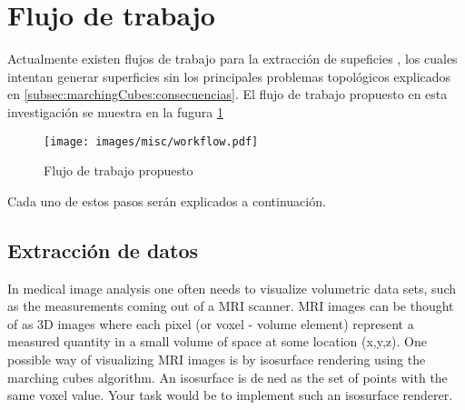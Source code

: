 \section{Flujo de trabajo}
\label{ch:propuesta:sec:flujoDeTrabajo}

Actualmente existen flujos de trabajo para la extracción de supeficies \cite{Ruprecht94ascheme}\cite{Dietrich_marchingcubes}, los cuales intentan generar superficies sin los principales problemas topológicos explicados en \ref{subsec:marchingCubes:consecuencias}. El flujo de trabajo propuesto en esta investigación se muestra en la fugura \ref{f:estadoDelArte:flujoDeTrabajo}

\begin{figure}[htb]
\centering
	\texttt{[image: images/misc/workflow.pdf]}
\caption{Flujo de trabajo propuesto}
\label{f:estadoDelArte:flujoDeTrabajo}
\end{figure}

Cada uno de estos pasos serán explicados a continuación.

\subsection{Extracción de datos}
\label{ch:propuesta:sec:extraccionDeDatos}

In medical image analysis one often needs to visualize volumetric data sets, such as the
measurements coming out of a MRI scanner. MRI images can be thought of as 3D images
where each pixel (or voxel - volume element) represent a measured quantity in a small
volume of space at some location (x,y,z). One possible way of visualizing MRI images is
by isosurface rendering using the marching cubes algorithm. An isosurface is dened as
the set of points with the same voxel value. Your task would be to implement such an
isosurface renderer.